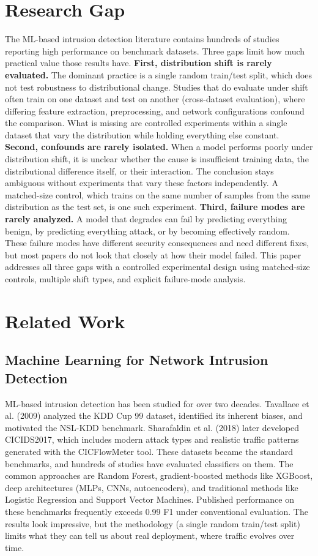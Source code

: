 \documentclass[10pt]{article}
\begin{document}
\section{Research Gap}
The ML-based intrusion detection literature contains hundreds of studies reporting high performance on benchmark datasets. Three gaps limit how much practical value those results have.
\textbf{First, distribution shift is rarely evaluated.} The dominant practice is a single random train/test split, which does not test robustness to distributional change. Studies that do evaluate under shift often train on one dataset and test on another (cross-dataset evaluation), where differing feature extraction, preprocessing, and network configurations confound the comparison. What is missing are controlled experiments within a single dataset that vary the distribution while holding everything else constant.
\textbf{Second, confounds are rarely isolated.} When a model performs poorly under distribution shift, it is unclear whether the cause is insufficient training data, the distributional difference itself, or their interaction. The conclusion stays ambiguous without experiments that vary these factors independently. A matched-size control, which trains on the same number of samples from the same distribution as the test set, is one such experiment.
\textbf{Third, failure modes are rarely analyzed.} A model that degrades can fail by predicting everything benign, by predicting everything attack, or by becoming effectively random. These failure modes have different security consequences and need different fixes, but most papers do not look that closely at how their model failed.
This paper addresses all three gaps with a controlled experimental design using matched-size controls, multiple shift types, and explicit failure-mode analysis.
\section{Related Work}
\subsection{Machine Learning for Network Intrusion Detection}
ML-based intrusion detection has been studied for over two decades. Tavallaee et al. (2009) analyzed the KDD Cup 99 dataset, identified its inherent biases, and motivated the NSL-KDD benchmark. Sharafaldin et al. (2018) later developed CICIDS2017, which includes modern attack types and realistic traffic patterns generated with the CICFlowMeter tool. These datasets became the standard benchmarks, and hundreds of studies have evaluated classifiers on them.
The common approaches are Random Forest, gradient-boosted methods like XGBoost, deep architectures (MLPs, CNNs, autoencoders), and traditional methods like Logistic Regression and Support Vector Machines. Published performance on these benchmarks frequently exceeds 0.99 F1 under conventional evaluation. The results look impressive, but the methodology (a single random train/test split) limits what they can tell us about real deployment, where traffic evolves over time.
\end{document}
